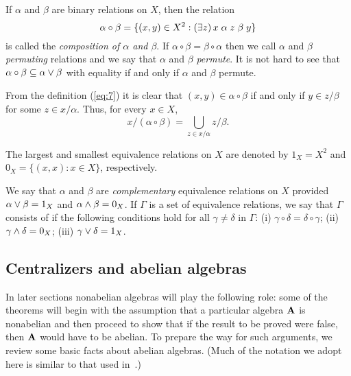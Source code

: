 If $\alpha$ and $\beta$ are binary relations on $X$, then the relation
\begin{equation}
  \label{eq:7}
\alpha \circ \beta = \{(x,y) \in X^2: (\exists z)\, x \mathrel{\alpha} z
\mathrel{\beta} y\}
\end{equation}
is called the \emph{composition of $\alpha$ and $\beta$}. If 
$\alpha \circ \beta = \beta \circ \alpha$ then we call $\alpha$ and $\beta$ 
\emph{permuting} relations and we say that $\alpha$ and $\beta$ \emph{permute}. 
It is not hard to see that $\alpha \circ \beta \subseteq \alpha \vee \beta$
with equality if and only if $\alpha$ and $\beta$ permute.

From the definition (\ref{eq:7}) it is clear that %
$(x,y) \in \alpha\circ \beta$ if and only if
$y \in z/\beta$ for some $z\in x/\alpha$.  Thus, for every $x\in X$,
  \begin{equation}
    \label{eq:1}
x/(\alpha\circ \beta) = \bigcup_{z \in x/\alpha} z/\beta.
  \end{equation}


The largest and smallest equivalence relations on $X$ are denoted by $1_X = X^2$
and $0_X = \{(x,x) : x \in X\}$, respectively.

We say that $\alpha$ and $\beta$ are \emph{complementary} equivalence relations
on $X$ provided $\alpha \vee \beta = 1_X$ and $\alpha \wedge \beta = 0_X$.
If $\Gamma$ is a set of equivalence relations, 
we say that $\Gamma$ consists of 
if the following conditions hold for all $\gamma \neq \delta$ in $\Gamma$:
(i) $\gamma \circ \delta = \delta \circ \gamma$;  
(ii) $\gamma \wedge \delta = 0_X$;  
(iii) $\gamma \vee \delta = 1_X$.


\subsection{Centralizers and abelian algebras}
In later sections nonabelian algebras will play the following role:
some of the theorems will begin with the assumption 
that a particular algebra $\mathbf{A}$ is nonabelian and then proceed to show that 
if the result to be proved were false, then $\mathbf{A}$ would have to be abelian. 
To prepare the way for such arguments, we review some basic facts about abelian
algebras. (Much of the notation we adopt here is similar to that used
in~\cite{MR3076179}.)

